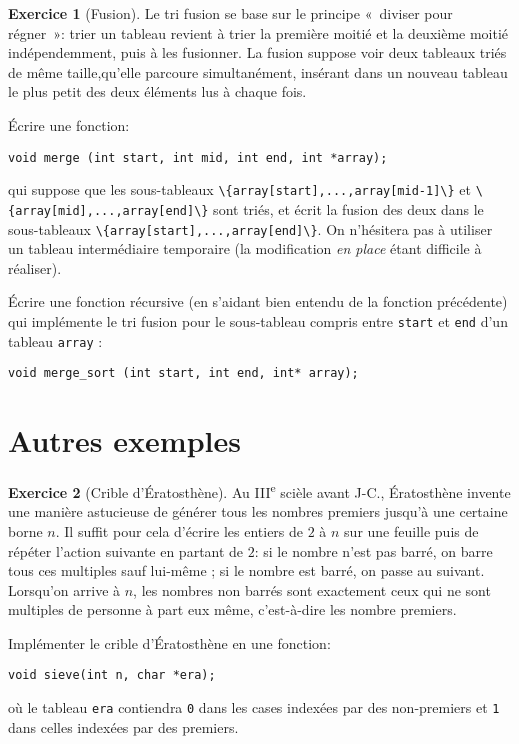 \documentclass[french,a4paper]{article}
\theoremstyle{definition}
\newtheorem{exercise}{Exercice}
\theoremstyle{remark}
\newcommand{\inlinec}[1]{\lstinline[style=C]°#1°}
\begin{document}
\begin{exercise}[Fusion]
  Le tri fusion se base sur le principe «~diviser pour régner~»: trier
  un tableau revient à trier la première moitié et la deuxième moitié
  indépendemment, puis à les fusionner. La fusion suppose voir deux
  tableaux triés de même taille,qu'elle parcoure simultanément,
  insérant dans un nouveau tableau le plus petit des deux éléments lus
  à chaque fois.

  \'Ecrire une fonction:
  \begin{lstlisting}
void merge (int start, int mid, int end, int *array);
  \end{lstlisting}
  qui suppose que les sous-tableaux
  \inlinec{\{array[start],...,array[mid-1]\}} et
  \inlinec{\{array[mid],...,array[end]\}} sont triés, et écrit la
  fusion des deux dans le sous-tableaux
  \inlinec{\{array[start],...,array[end]\}}. On n'hésitera pas à
  utiliser un tableau intermédiaire temporaire (la modification {\em
    en place} étant difficile à réaliser).

  \'Ecrire une fonction récursive (en s'aidant bien entendu de la
  fonction précédente) qui implémente le tri fusion pour le
  sous-tableau compris entre \inlinec{start} et \inlinec{end} d'un
  tableau \inlinec{array} :
  \begin{lstlisting}
void merge_sort (int start, int end, int* array);
  \end{lstlisting}
\end{exercise}

\section{Autres exemples}
\label{sec:other}

\begin{exercise}[Crible d'\'Eratosthène]
  Au {\sc III}\textsuperscript{e} scièle avant J-C., \'Eratosthène
  invente une manière astucieuse de générer tous les nombres premiers
  jusqu'à une certaine borne $n$. Il suffit pour cela d'écrire les
  entiers de $2$ à $n$ sur une feuille puis de répéter l'action
  suivante en partant de $2$: si le nombre n'est pas barré, on barre
  tous ces multiples sauf lui-même ; si le nombre est barré, on passe
  au suivant. Lorsqu'on arrive à $n$, les nombres non barrés sont
  exactement ceux qui ne sont multiples de personne à part eux même,
  c'est-à-dire les nombre premiers.

  Implémenter le crible d'\'Eratosthène en une fonction:
  \begin{lstlisting}
void sieve(int n, char *era);
  \end{lstlisting}
  où le tableau \inlinec{era} contiendra \inlinec{0} dans les cases
  indexées par des non-premiers et \inlinec{1} dans celles indexées
  par des premiers.
\end{exercise}
\end{document}
